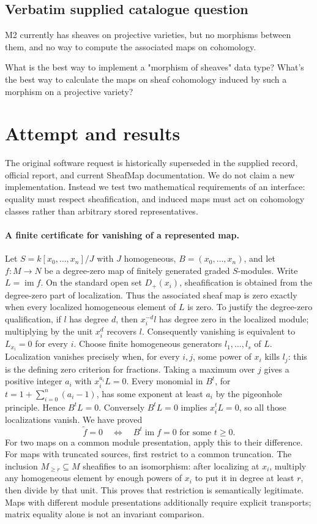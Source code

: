 \documentclass[11pt]{article}
\begin{document}
\subsection{Verbatim supplied catalogue question}
M2 currently has sheaves on projective varieties, but no morphisms between them, and no way to compute the associated maps on cohomology.

What is the best way to implement a "morphism of sheaves" data type? What's the best way to calculate the maps on sheaf cohomology induced by such a morphism on a projective variety?

\section{Attempt and results}
The original software request is historically superseded in the supplied
record, official report, and current SheafMap documentation. We do not claim
a new implementation. Instead we test two mathematical requirements of an
interface: equality must respect sheafification, and induced maps must act on
cohomology classes rather than arbitrary stored representatives.

\paragraph{A finite certificate for vanishing of a represented map.}
Let $S=k[x_0,\ldots,x_n]/J$ with $J$ homogeneous, $B=(x_0,\ldots,x_n)$,
and let $f:M\to N$ be a degree-zero map of finitely generated graded
$S$-modules. Write $L=\operatorname{im}f$. On the standard open set
$D_+(x_i)$, sheafification is obtained from the degree-zero part of
localization. Thus the associated sheaf map is zero exactly when every
localized homogeneous element of $L$ is zero. To justify the degree-zero
qualification, if $l$ has degree $d$, then $x_i^{-d}l$ has degree zero
in the localized module; multiplying by the unit $x_i^d$ recovers $l$.
Consequently vanishing is equivalent to $L_{x_i}=0$ for every $i$.
Choose finite homogeneous generators $l_1,\ldots,l_s$ of $L$.
Localization vanishes precisely when, for every $i,j$, some power of $x_i$
kills $l_j$: this is the defining zero criterion for fractions. Taking a
maximum over $j$ gives a positive integer $a_i$ with $x_i^{a_i}L=0$.
Every monomial in $B^t$, for
$t=1+\sum_{i=0}^n(a_i-1)$, has some exponent at least $a_i$ by the
pigeonhole principle. Hence $B^t L=0$. Conversely $B^tL=0$ implies
$x_i^t L=0$, so all those localizations vanish. We have proved
\[
\widetilde f=0\quad\Longleftrightarrow\quad
B^t\operatorname{im}f=0\text{ for some }t\ge0.
\]
For two maps on a common module presentation, apply this to their difference.
For maps with truncated sources, first restrict to a common truncation.
The inclusion $M_{\ge r}\subseteq M$ sheafifies to an isomorphism: after
localizing at $x_i$, multiply any homogeneous element by enough powers of
$x_i$ to put it in degree at least $r$, then divide by that unit. This proves
that restriction is semantically legitimate. Maps with different module
presentations additionally require explicit transports; matrix equality
alone is not an invariant comparison.
\end{document}
